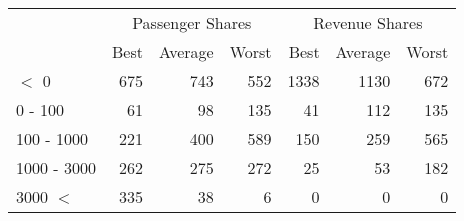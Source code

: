 
\begin{tabular}[t]{lrrrrrr}
\toprule
\multicolumn{1}{c}{ } & \multicolumn{3}{c}{Passenger Shares} & \multicolumn{3}{c}{Revenue Shares} \\
\cmidrule(l{3pt}r{3pt}){2-4} \cmidrule(l{3pt}r{3pt}){5-7}
 & Best & Average & Worst & Best & Average & Worst\\
\midrule
$<$ 0 & 675 & 743 & 552 & 1338 & 1130 & 672\\
0 - 100 & 61 & 98 & 135 & 41 & 112 & 135\\
100 - 1000 & 221 & 400 & 589 & 150 & 259 & 565\\
1000 - 3000 & 262 & 275 & 272 & 25 & 53 & 182\\
3000 $<$ & 335 & 38 & 6 & 0 & 0 & 0\\
\bottomrule
\end{tabular}
